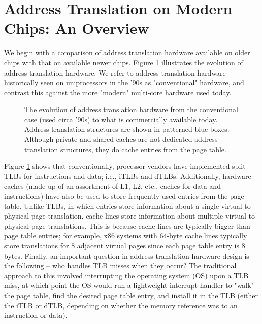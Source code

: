 \documentclass{article}
\begin{document}
\section{Address Translation on Modern Chips: An Overview}\label{sec:address-translation-on-modern-chips}

We begin with a comparison of address translation hardware available on older chips with that on available newer chips. Figure \ref{fig:address-translation-then-and-now} illustrates the evolution of address translation hardware. We refer to address translation hardware historically seen on uniprocessors in the '90s as "conventional" hardware, and contrast this against the more "modern" multi-core hardware used today.

\begin{figure}[t]
\centering
{
\begin{minipage}[t]{1.00\textwidth}
\centering
\vspace{-10mm}
\vspace{-44mm}
\caption{\small The evolution of address translation hardware from the conventional case (used circa '90s) to what is commercially available today. Address translation structures are shown in patterned blue boxes. Although private and shared caches are not dedicated address translation structures, they do cache entries from the page table.}
\label{fig:address-translation-then-and-now}
\end{minipage}
}
\end{figure}

Figure \ref{fig:address-translation-then-and-now} shows that conventionally, processor vendors have implemented split TLBs for instructions and data; i.e., iTLBs and dTLBs. Additionally, hardware caches (made up of an assortment of L1, L2, etc., caches for data and instructions) have also be used to store frequently-used entries from the page table. Unlike TLBs, in which entries store information about a single virtual-to-physical page translation, cache lines store information about multiple virtual-to-physical page translations. This is because cache lines are typically bigger than page table entries; for example, x86 systems with 64-byte cache lines typically store translations for 8 adjacent virtual pages since each page table entry is 8 bytes. Finally, an important question in address translation hardware design is the following -- who handles TLB misses when they occur? The traditional approach to this involved interrupting the operating system (OS) upon a TLB miss, at which point the OS would run a lightweight interrupt handler to "walk" the page table, find the desired page table entry, and install it in the TLB (either the iTLB or dTLB, depending on whether the memory reference was to an instruction or data).
\end{document}
